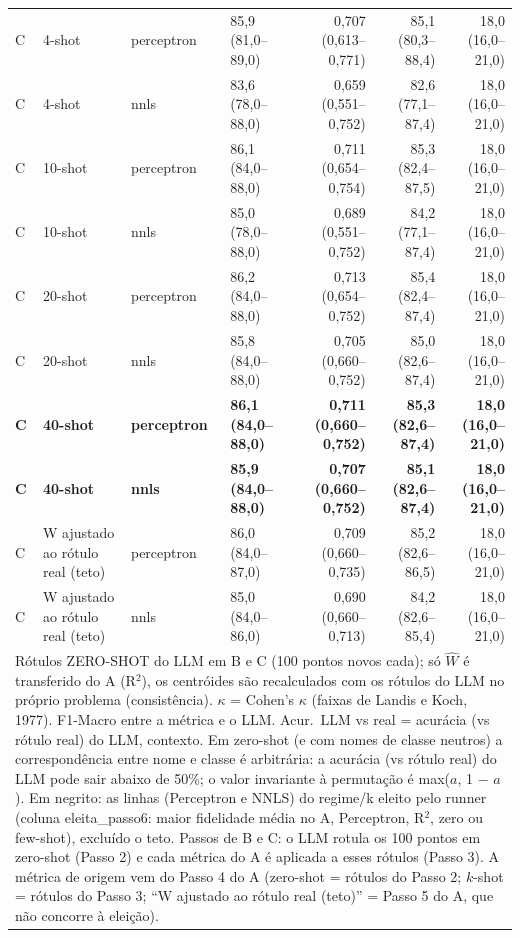 \begin{table}[htbp]
\begin{tabular}{llllrrr}
C & 4-shot & perceptron & 85,9 (81,0–89,0) & 0,707 (0,613–0,771) & 85,1 (80,3–88,4) & 18,0 (16,0–21,0) \\
C & 4-shot & nnls & 83,6 (78,0–88,0) & 0,659 (0,551–0,752) & 82,6 (77,1–87,4) & 18,0 (16,0–21,0) \\
C & 10-shot & perceptron & 86,1 (84,0–88,0) & 0,711 (0,654–0,754) & 85,3 (82,4–87,5) & 18,0 (16,0–21,0) \\
C & 10-shot & nnls & 85,0 (78,0–88,0) & 0,689 (0,551–0,752) & 84,2 (77,1–87,4) & 18,0 (16,0–21,0) \\
C & 20-shot & perceptron & 86,2 (84,0–88,0) & 0,713 (0,654–0,752) & 85,4 (82,4–87,4) & 18,0 (16,0–21,0) \\
C & 20-shot & nnls & 85,8 (84,0–88,0) & 0,705 (0,660–0,752) & 85,0 (82,6–87,4) & 18,0 (16,0–21,0) \\
\textbf{C} & \textbf{40-shot} & \textbf{perceptron} & \textbf{86,1 (84,0–88,0)} & \textbf{0,711 (0,660–0,752)} & \textbf{85,3 (82,6–87,4)} & \textbf{18,0 (16,0–21,0)} \\
\textbf{C} & \textbf{40-shot} & \textbf{nnls} & \textbf{85,9 (84,0–88,0)} & \textbf{0,707 (0,660–0,752)} & \textbf{85,1 (82,6–87,4)} & \textbf{18,0 (16,0–21,0)} \\
C & W ajustado ao rótulo real (teto) & perceptron & 86,0 (84,0–87,0) & 0,709 (0,660–0,735) & 85,2 (82,6–86,5) & 18,0 (16,0–21,0) \\
C & W ajustado ao rótulo real (teto) & nnls & 85,0 (84,0–86,0) & 0,690 (0,660–0,713) & 84,2 (82,6–85,4) & 18,0 (16,0–21,0) \\
\bottomrule
\multicolumn{7}{p{0.95\linewidth}}{\footnotesize Rótulos ZERO-SHOT do LLM em B e C (100 pontos novos cada); só $\hat{W}$ é transferido do A (R$^2$), os centróides são recalculados com os rótulos do LLM no próprio problema (consistência). $\kappa$ = Cohen's $\kappa$ (faixas de Landis e Koch, 1977). F1-Macro entre a métrica e o LLM. Acur.\ LLM vs real = acurácia (vs rótulo real) do LLM, contexto. Em zero-shot (e com nomes de classe neutros) a correspondência entre nome e classe é arbitrária: a acurácia (vs rótulo real) do LLM pode sair abaixo de 50\%; o valor invariante à permutação é max($a$, 1 $-$ $a$). Em negrito: as linhas (Perceptron e NNLS) do regime/k eleito pelo runner (coluna eleita\_passo6: maior fidelidade média no A, Perceptron, R$^2$, zero ou few-shot), excluído o teto. Passos de B e C: o LLM rotula os 100 pontos em zero-shot (Passo 2) e cada métrica do A é aplicada a esses rótulos (Passo 3). A métrica de origem vem do Passo 4 do A (zero-shot = rótulos do Passo 2; $k$-shot = rótulos do Passo 3; ``W ajustado ao rótulo real (teto)'' = Passo 5 do A, que não concorre à eleição).} \\
\end{tabular}
\end{table}

